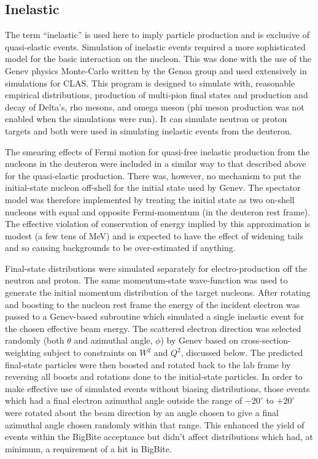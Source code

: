 \documentclass[12pt,letterpaper,oneside]{article}
\begin{document}
\subsection{Inelastic}

The term ``inelastic'' is used here to imply particle production
and is exclusive of quasi-elastic events.
Simulation of inelastic events required a more sophisticated model for
the basic interaction on the nucleon.  This was done with the use of
the  Genev physics Monte-Carlo \cite{genev} written by the Genoa
group and used extensively in simulations for CLAS.  This program is
designed to simulate with, reasonable empirical distributions,
production of multi-pion final states and production and decay of
Delta's, rho mesons, and omega meson (phi meson production was not
enabled when the simulations were run).  It can simulate 
neutron or proton targets and both were used in simulating
inelastic events from the deuteron.  


The smearing effects of Fermi motion for quasi-free inelastic
production from the nucleons in the deuteron were included in a
similar way to that described above for the quasi-elastic production.  
There was, however, no mechanism to
put the initial-state nucleon off-shell for the initial state used by
Genev.  The spectator model was therefore implemented by treating the
initial state as two on-shell nucleons with equal and opposite
Fermi-momentum (in the deuteron rest frame).  The effective violation
of conservation of energy implied by this approximation is modest
(a few tens of MeV) and is expected to have the effect of
widening tails and so causing backgrounds to be over-estimated if anything.


Final-state distributions were simulated separately for
electro-production off the neutron and proton.
The same momentum-state wave-function was used to generate the initial
momentum distribution of the target nucleons.  After rotating and
boosting to the nucleon rest frame the energy of the incident electron
was passed to a Genev-based subroutine which simulated a single
inelastic event for the chosen effective beam energy.  The scattered
electron direction was selected randomly (both $\theta$ and azimuthal
angle, $\phi$) 
by Genev based on cross-section-weighting subject to constraints on
$W^2$ and $Q^2$, discussed below.  The predicted final-state particles
were then boosted and rotated back to the lab frame by reversing all
boosts and rotations done to the initial-state particles.  In order to
make effective use of simulated events without biasing 
distributions, those events which had
a final electron azimuthal angle outside the range of
$-20^\circ$ to $+20^\circ$ were rotated about the beam direction by an
angle chosen to give a final azimuthal angle chosen randomly within
that range.  This enhanced the yield of events within the BigBite
acceptance but didn't affect distributions which had, at minimum, a
requirement of a hit in BigBite.
\end{document}
